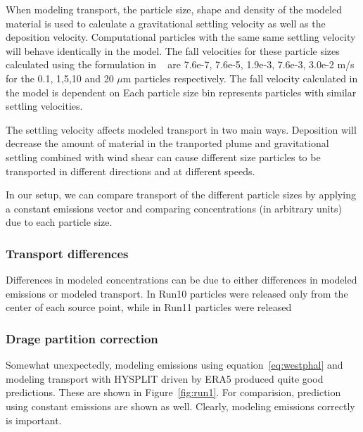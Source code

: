 
When modeling transport, the particle size, shape and density of the modeled material is used to calculate a gravitational settling velocity as well as the deposition velocity.
Computational particles with the same same settling velocity will behave identically in the model. 
The fall velocities for these particle sizes calculated using the formulation in ~\cite{Ganser} are 
7.6e-7, 7.6e-5, 1.9e-3, 7.6e-3, 3.0e-2 m/s for the 0.1, 1,5,10 and 20 $\mu\mathrm{m}$ particles respectively. 
The fall velocity calculated in the model is dependent on 
Each particle size bin represents particles with similar settling velocities. 

The settling velocity affects modeled transport in
two main ways. Deposition will decrease the amount of material in the tranported plume and gravitational settling combined with wind
shear can cause different size particles to be transported in different directions and at different speeds. 

In our setup, we can compare transport of the different particle sizes by applying a constant emissions vector and comparing concentrations (in arbitrary units) due to each
particle size. 

\subsubsection{Transport differences}

Differences in modeled concentrations can be due to either differences in modeled emissions or modeled transport. 
In Run10 particles were released only from the center of each source point, while in Run11 particles were released 



\subsubsection{Drage partition correction}

Somewhat unexpectedly, modeling emissions using equation~\ref{eq:westphal} and modeling transport with HYSPLIT driven by ERA5 produced quite good predictions. These are shown in Figure~\ref{fig:run1}.
For comparision, prediction using constant emissions are shown as well. Clearly, modeling emissions correctly is important.

